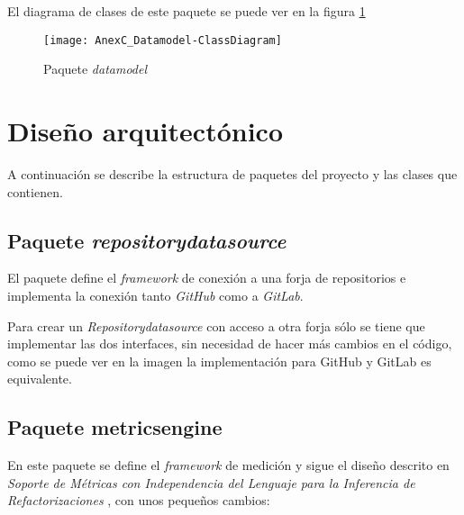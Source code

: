 El diagrama de clases de este paquete se puede ver en la figura \ref{fig:AnexC_Datamodel-ClassDiagram}

\begin{figure}[!h]
	\centering
	\texttt{[image: AnexC\_Datamodel-ClassDiagram]}
	\caption{Paquete \textit{datamodel}}\label{fig:AnexC_Datamodel-ClassDiagram}
\end{figure}
\FloatBarrier
	
\section{Diseño arquitectónico}
A continuación se describe la estructura de paquetes del proyecto y las clases que contienen.

\subsection{Paquete \textit{repositorydatasource}}
El paquete define el \textit{framework} de conexión a una forja de repositorios e implementa la conexión tanto \textit{GitHub} como a \textit{GitLab}.


Para crear un \textit{Repositorydatasource} con acceso a otra forja sólo se tiene que implementar las dos interfaces, sin necesidad de hacer más cambios en el código, como se puede ver en la imagen la implementación para GitHub y GitLab es equivalente.

\subsection{Paquete metricsengine}
En este paquete se define el \textit{framework} de medición y sigue el diseño descrito en \textit{Soporte de Métricas con Independencia del Lenguaje para la Inferencia de Refactorizaciones} \cite{marticorena_sanchez_soporte_2005}, con unos pequeños cambios:

